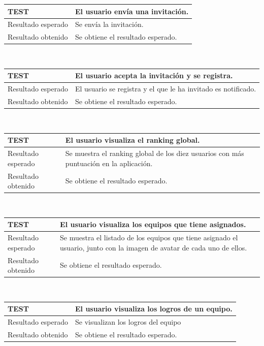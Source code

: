 \documentclass[twoside]{report}
\newcommand\addrow[2]{#1 &#2\\ }
\newcommand\addheading[2]{#1 &#2\\ \hline}
\newcommand\tabularhead{\begin{tabular}{lp{0.7\textwidth}}
\hline
}
\newenvironment{test}{\tabularhead}
{\hline\end{tabular}}
\begin{document}
\vspace{0.5cm}

\begin{test}
  \addheading{\textbf{TEST\arabic{test}}}{El usuario envía una invitación.} 
  \addrow{Resultado esperado}{Se envía la invitación.}
  \addrow{Resultado obtenido}{Se obtiene el resultado esperado.}
\end{test}\\

\vspace{0.5cm}

\begin{test}
  \addheading{\textbf{TEST\arabic{test}}}{El usuario acepta la invitación y se registra.} 
  \addrow{Resultado esperado}{El usuario se registra y el que le ha invitado es notificado.}
  \addrow{Resultado obtenido}{Se obtiene el resultado esperado.}
\end{test}\\

\vspace{0.5cm}

\begin{test}
  \addheading{\textbf{TEST\arabic{test}}}{El usuario visualiza el ranking global.} 
  \addrow{Resultado esperado}{Se muestra el ranking global de los diez usuarios con más puntuación en la aplicación.}
  \addrow{Resultado obtenido}{Se obtiene el resultado esperado.}
\end{test}\\

\vspace{0.5cm}

\begin{test}
  \addheading{\textbf{TEST\arabic{test}}}{El usuario visualiza los equipos que tiene asignados.} 
  \addrow{Resultado esperado}{Se muestra el listado de los equipos que tiene asignado el usuario, junto con la imagen de avatar de cada uno de ellos.}
  \addrow{Resultado obtenido}{Se obtiene el resultado esperado.}
\end{test}\\

\vspace{0.5cm}

\begin{test}
  \addheading{\textbf{TEST\arabic{test}}}{El usuario visualiza los logros de un equipo.} 
  \addrow{Resultado esperado}{Se visualizan los logros del equipo}
  \addrow{Resultado obtenido}{Se obtiene el resultado esperado.}
\end{test}\\
\end{document}

